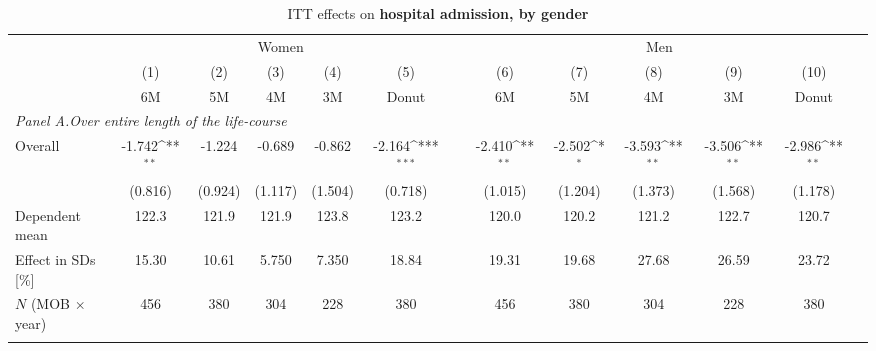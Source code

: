 \begin{landscape}
\vspace*{\fill}
 \begin{table}[H] \centering 
 	\begin{threeparttable} \centering \caption{ITT effects on \textbf{hospital admission, by gender}}\label{tab_mlch: DD_hospital2_female_male} {\def\sym#1{\ifmmode^{#1}\else\(^{#1}\)\fi} 
 			\begin{tabular}{l*{12}{c}}
 				\toprule 
 				& \multicolumn{5}{c}{Women} && \multicolumn{5}{c}{Men} \\ 
 				\cmidrule(lr){2-6} \cmidrule(lr){8-12}
 				&\multicolumn{1}{c}{(1)}&\multicolumn{1}{c}{(2)}&\multicolumn{1}{c}{(3)}&\multicolumn{1}{c}{(4)}&\multicolumn{1}{c}{(5)}&\multicolumn{1}{c}{        }&\multicolumn{1}{c}{(6)}&\multicolumn{1}{c}{(7)}&\multicolumn{1}{c}{(8)}&\multicolumn{1}{c}{(9)}&\multicolumn{1}{c}{(10)}\\
 				&\multicolumn{1}{c}{6M}&\multicolumn{1}{c}{5M}&\multicolumn{1}{c}{4M}&\multicolumn{1}{c}{3M}&\multicolumn{1}{c}{Donut}&&\multicolumn{1}{c}{6M}&\multicolumn{1}{c}{5M}&\multicolumn{1}{c}{4M}&\multicolumn{1}{c}{3M}&\multicolumn{1}{c}{Donut}\\
 				\midrule
 				\multicolumn{5}{l}{\emph{Panel A.Over entire length of the life-course}} \\

 				\hspace*{10pt}Overall		&      -1.742\sym{**} &      -1.224         &      -0.689         &      -0.862         &      -2.164\sym{***} &&      -2.410\sym{**} &      -2.502\sym{*}  &      -3.593\sym{**} &      -3.506\sym{**} &      -2.986\sym{**} \\
				                    		&     (0.816)         &     (0.924)         &     (1.117)         &     (1.504)         &     (0.718)          &&     (1.015)         &     (1.204)         &     (1.373)         &     (1.568)         &     (1.178)         \\
				\midrule Dependent mean		&       122.3         &       121.9         &       121.9         &       123.8         &       123.2          &&       120.0         &       120.2         &       121.2         &       122.7         &       120.7         \\
				Effect in SDs [\%]  		&       15.30         &       10.61         &       5.750         &       7.350         &       18.84          &&       19.31         &       19.68         &       27.68         &       26.59         &       23.72         \\
				\(N\) (MOB $\times$ year)	&         456         &         380         &         304         &         228         &         380          &&         456         &         380         &         304         &         228         &         380         \\
 				\\


\end{tabular}}
\end{threeparttable}
\end{table}
\end{landscape}
